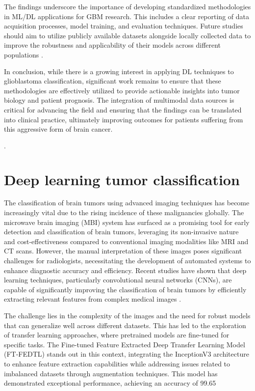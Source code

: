 \documentclass[runningheads]{llncs}
\begin{document}
The findings underscore the importance of developing standardized methodologies in ML/DL applications for GBM research. This includes a clear reporting of data acquisition processes, model training, and evaluation techniques. Future studies should aim to utilize publicly available datasets alongside locally collected data to improve the robustness and applicability of their models across different populations \cite{Chun_2025}. 

In conclusion, while there is a growing interest in applying DL techniques to glioblastoma classification, significant work remains to ensure that these methodologies are effectively utilized to provide actionable insights into tumor biology and patient prognosis. The integration of multimodal data sources is critical for advancing the field and ensuring that the findings can be translated into clinical practice, ultimately improving outcomes for patients suffering from this aggressive form of brain cancer.

.
\section{Deep learning tumor classification}
The classification of brain tumors using advanced imaging techniques has become increasingly vital due to the rising incidence of these malignancies globally. The microwave brain imaging (MBI) system has surfaced as a promising tool for early detection and classification of brain tumors, leveraging its non-invasive nature and cost-effectiveness compared to conventional imaging modalities like MRI and CT scans. However, the manual interpretation of these images poses significant challenges for radiologists, necessitating the development of automated systems to enhance diagnostic accuracy and efficiency. Recent studies have shown that deep learning techniques, particularly convolutional neural networks (CNNs), are capable of significantly improving the classification of brain tumors by efficiently extracting relevant features from complex medical images \cite{Vivian_2024}.

The challenge lies in the complexity of the images and the need for robust models that can generalize well across different datasets. This has led to the exploration of transfer learning approaches, where pretrained models are fine-tuned for specific tasks. The Fine-tuned Feature Extracted Deep Transfer Learning Model (FT-FEDTL) stands out in this context, integrating the InceptionV3 architecture to enhance feature extraction capabilities while addressing issues related to imbalanced datasets through augmentation techniques. This model has demonstrated exceptional performance, achieving an accuracy of 99.65%
\end{document}
